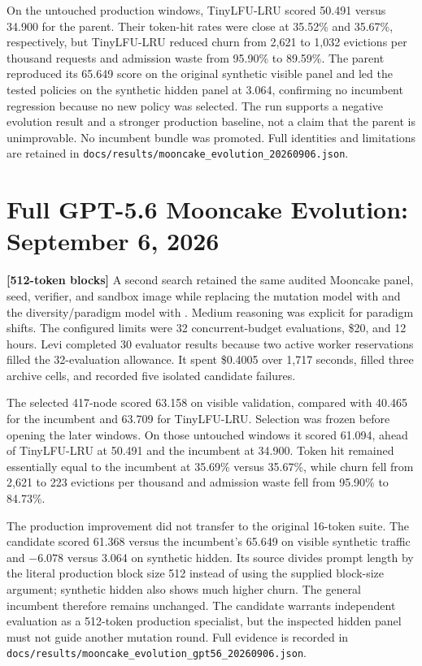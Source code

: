 \documentclass[11pt]{article}
\newcommand{\code}[1]{\texttt{\detokenize{#1}}}
\newcommand{\filepath}[1]{\nolinkurl{#1}}
\newcommand{\blocktag}[1]{\textbf{\color{navy}[#1-token blocks]}}
\begin{document}
On the untouched production windows, TinyLFU-LRU scored 50.491 versus 34.900 for
the parent.  Their token-hit rates were close at 35.52\% and 35.67\%, respectively,
but TinyLFU-LRU reduced churn from 2,621 to 1,032 evictions per thousand requests
and admission waste from 95.90\% to 89.59\%.  The parent reproduced its 65.649
score on the original synthetic visible panel and led the tested policies on the
synthetic hidden panel at 3.064, confirming no incumbent regression because no
new policy was selected.  The run supports a negative evolution result and a
stronger production baseline, not a claim that the parent is unimprovable.  No
incumbent bundle was promoted.  Full identities and limitations are retained in
\filepath{docs/results/mooncake\_evolution\_20260906.json}.

\section{Full GPT-5.6 Mooncake Evolution: September 6, 2026}

\blocktag{512} A second search retained the same audited Mooncake panel, seed,
verifier, and sandbox image while replacing the mutation model with
\code{gpt-5.6-luna} and the diversity/paradigm model with
\code{gpt-5.6-sol}.  Medium reasoning was explicit for paradigm shifts.  The
configured limits were 32 concurrent-budget evaluations, \$20, and 12 hours.
Levi completed 30 evaluator results because two active worker reservations
filled the 32-evaluation allowance.  It spent \$0.4005 over 1,717 seconds,
filled three archive cells, and recorded five isolated candidate failures.

The selected 417-node \code{SegmentedGhostPolicy} scored 63.158 on visible
validation, compared with 40.465 for the incumbent and 63.709 for TinyLFU-LRU.
Selection was frozen before opening the later windows.  On those untouched
windows it scored 61.094, ahead of TinyLFU-LRU at 50.491 and the incumbent at
34.900.  Token hit remained essentially equal to the incumbent at 35.69\%
versus 35.67\%, while churn fell from 2,621 to 223 evictions per thousand and
admission waste fell from 95.90\% to 84.73\%.

The production improvement did not transfer to the original 16-token suite.
The candidate scored 61.368 versus the incumbent's 65.649 on visible synthetic
traffic and $-6.078$ versus 3.064 on synthetic hidden.  Its source divides
prompt length by the literal production block size 512 instead of using the
supplied block-size argument; synthetic hidden also shows much higher churn.
The general incumbent therefore remains unchanged.  The candidate warrants
independent evaluation as a 512-token production specialist, but the inspected
hidden panel must not guide another mutation round.  Full evidence is recorded
in \filepath{docs/results/mooncake\_evolution\_gpt56\_20260906.json}.
\end{document}
